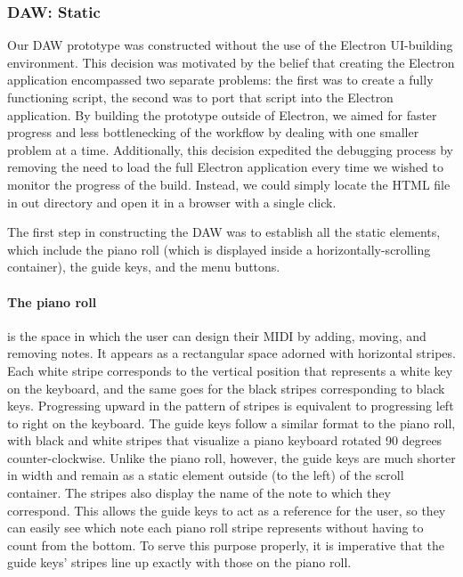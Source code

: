 \subsubsection{DAW: Static}

Our DAW prototype was constructed without the use of the Electron UI-building environment. This
decision was motivated by the belief that creating the Electron application encompassed two
separate problems: the first was to create a fully functioning script, the second was to port that
script into the Electron application. By building the prototype outside of Electron, we aimed for
faster progress and less bottlenecking of the workflow by dealing with one smaller problem at a
time. Additionally, this decision expedited the debugging process by removing the need to load
the full Electron application every time we wished to monitor the progress of the build. Instead,
we could simply locate the HTML file in out directory and open it in a browser with a single click.

The first step in constructing the DAW was to establish all the static elements, which include
the piano roll (which is displayed inside a horizontally-scrolling container), the guide keys, and
the menu buttons.

\paragraph{The piano roll} is the space in which the user can design their MIDI by adding,
moving, and removing notes. It appears as a rectangular space adorned with horizontal stripes. Each
white stripe corresponds to the vertical position that represents a white key on the keyboard, and
the same goes for the black stripes corresponding to black keys. Progressing upward in the pattern
of stripes is equivalent to progressing left to right on the keyboard. The guide keys follow a
similar format to the piano roll, with black and white stripes that visualize a piano keyboard
rotated 90 degrees counter-clockwise. Unlike the piano roll, however, the guide keys are much
shorter in width and remain as a static element outside (to the left) of the scroll container.
The stripes also display the name of the note to which they correspond. This allows the guide keys
to act as a reference for the user, so they can easily see which note each piano roll stripe
represents without having to count from the bottom. To serve this purpose properly, it is
imperative that the guide keys' stripes line up exactly with those on the piano roll.

